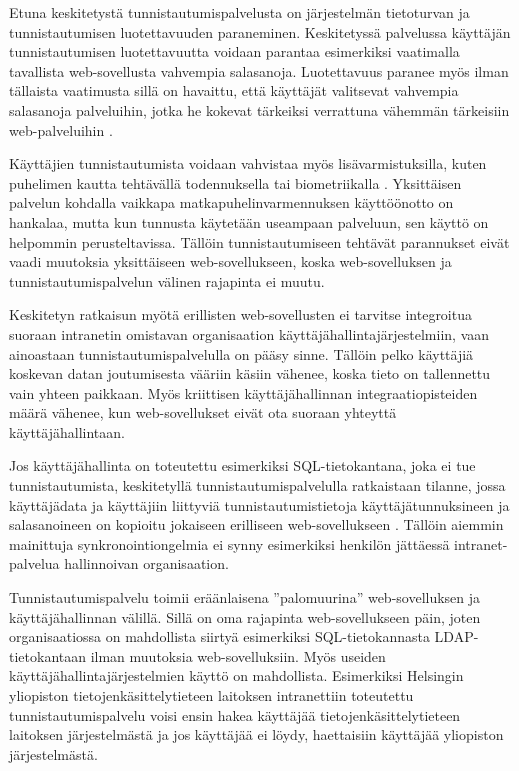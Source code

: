 Etuna keskitetystä tunnistautumispalvelusta on järjestelmän tietoturvan ja tunnistautumisen luotettavuuden paraneminen. Keskitetyssä palvelussa käyttäjän tunnistautumisen luotettavuutta voidaan parantaa esimerkiksi vaatimalla tavallista web-sovellusta vahvempia salasanoja. Luotettavuus paranee myös ilman tällaista vaatimusta sillä on havaittu, että käyttäjät valitsevat vahvempia salasanoja palveluihin, jotka he kokevat tärkeiksi verrattuna vähemmän tärkeisiin web-palveluihin \cite{password_habits}.

Käyttäjien tunnistautumista voidaan vahvistaa myös lisävarmistuksilla, kuten puhelimen kautta tehtävällä todennuksella tai biometriikalla \cite{nisti}. Yksittäisen palvelun kohdalla vaikkapa matkapuhelinvarmennuksen käyttöönotto on hankalaa, mutta kun tunnusta käytetään useampaan palveluun, sen käyttö on helpommin perusteltavissa. Tällöin tunnistautumiseen tehtävät parannukset eivät vaadi muutoksia yksittäiseen web-sovellukseen, koska web-sovelluksen ja tunnistautumispalvelun välinen rajapinta ei muutu.

Keskitetyn ratkaisun myötä erillisten web-sovellusten ei tarvitse integroitua suoraan intranetin omistavan organisaation käyttäjähallintajärjestelmiin, vaan ainoastaan tunnistautumispalvelulla on pääsy sinne. Tällöin pelko käyttäjiä koskevan datan joutumisesta vääriin käsiin vähenee, koska tieto on tallennettu vain yhteen paikkaan. Myös kriittisen käyttäjähallinnan integraatiopisteiden määrä vähenee, kun web-sovellukset eivät ota suoraan yhteyttä käyttäjähallintaan.

Jos käyttäjähallinta on toteutettu esimerkiksi SQL-tietokantana, joka ei tue tunnistautumista, keskitetyllä tunnistautumispalvelulla ratkaistaan tilanne, jossa käyttäjädata ja käyttäjiin liittyviä tunnistautumistietoja käyttäjätunnuksineen ja salasanoineen on kopioitu jokaiseen erilliseen web-sovellukseen \cite{billion_keys}. Tällöin aiemmin mainittuja synkronointiongelmia ei synny esimerkiksi henkilön jättäessä intranet-palvelua hallinnoivan organisaation.

Tunnistautumispalvelu toimii eräänlaisena ''palomuurina'' web-sovelluksen ja käyttäjähallinnan välillä. Sillä on oma rajapinta web-sovellukseen päin, joten organisaatiossa on mahdollista siirtyä esimerkiksi SQL-tietokannasta LDAP-tietokantaan ilman muutoksia web-sovelluksiin. Myös useiden käyttäjähallintajärjestelmien käyttö on mahdollista. Esimerkiksi Helsingin yliopiston tietojenkäsittelytieteen laitoksen intranettiin toteutettu tunnistautumispalvelu voisi ensin hakea käyttäjää tietojenkäsittelytieteen laitoksen järjestelmästä ja jos käyttäjää ei löydy, haettaisiin käyttäjää yliopiston järjestelmästä.

